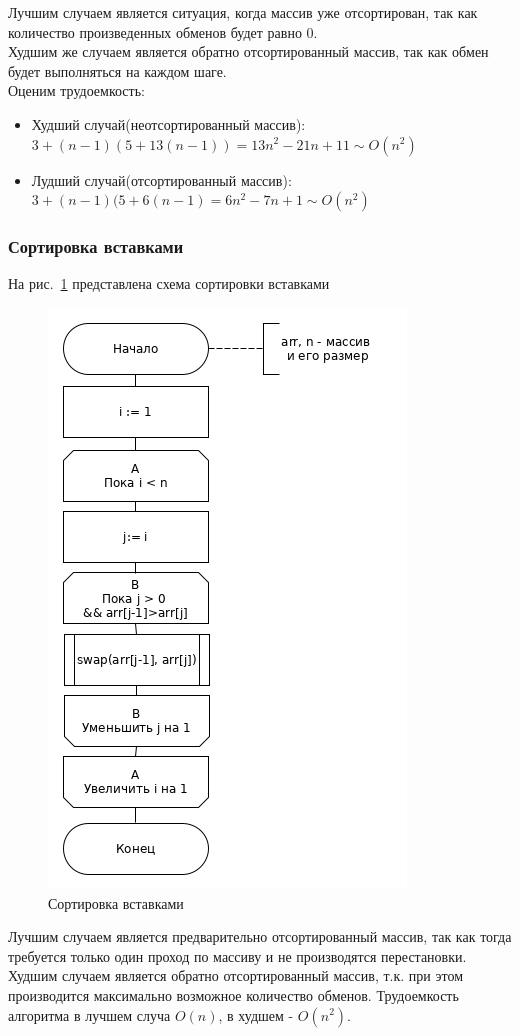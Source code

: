 \documentclass[a4paper,12pt]{article}
\begin{document}
	Лучшим случаем является ситуация, когда массив уже отсортирован, так как количество произведенных обменов будет равно 0.\\
	Худшим же случаем является обратно отсортированный массив, так как обмен будет выполняться на каждом шаге.\\
	Оценим трудоемкость:
	\begin{itemize}
		\item Худший случай(неотсортированный массив): $3 + (n - 1)(5 + 13(n-1)) = 13n^{2}-21n+11 \sim O(n^{2})$
		\item Лудший случай(отсортированный массив): $3 + (n - 1)(5 + 6(n - 1) = 6n^{2}-7n+1 \sim O(n^{2})$
	\end{itemize}
    \newpage
    \afterpage{\FloatBarrier}
    \subsubsection{Сортировка вставками}
        На рис.~\ref{ris:matr_lev_sh1} представлена схема сортировки вставками
		 		\begin{figure}[H]
		 			\centering
		 			{
		 				\includegraphics[scale=0.51]{insert.png}
		 				\caption{Сортировка вставками}
		 				\label{ris:matr_lev_sh1}
		 			}
		 		\end{figure}		 	
	Лучшим случаем является предварительно отсортированный массив, так как тогда требуется только один проход по массиву и не производятся перестановки.\\
	Худшим случаем является обратно отсортированный массив, т.к. при этом производится максимально возможное количество обменов.	
	Трудоемкость алгоритма в лучшем случа $O(n)$, в худшем - $O(n^{2})$\cite{litlink1}.
    \newpage
    \afterpage{\FloatBarrier}
\end{document}
